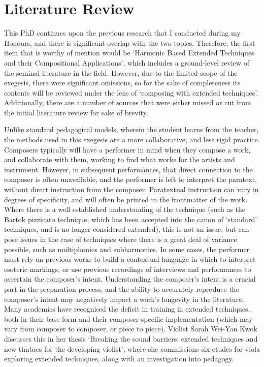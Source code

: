 \section{Literature Review}
This PhD continues upon the previous research that I conducted during my Honours, and there is significant overlap with the two topics.
Therefore, the first item that is worthy of mention would be `Harmonic Based Extended Techniques and their Compositional Applications', which includes a ground-level review of the seminal literature in the field.\autocite{grayHarmonicBasedExtended2019}
However, due to the limited scope of the exegesis, there were significant omissions, so for the sake of completeness its contents will be reviewed under the lens of `composing with extended techniques'.
Additionally, there are a number of sources that were either missed or cut from the initial literature review for sake of brevity.

Unlike standard pedagogical models, wherein the student learns from the teacher, the methods used in this exegesis are a more collaborative, and less rigid practice.
Composers typically will have a performer in mind when they compose a work, and collaborate with them, working to find what works for the artists and instrument.
However, in subsequent performances, that direct connection to the composer is often unavailable, and the performer is left to interpret the paratext, without direct instruction from the composer.
Paratextual instruction can vary in degrees of specificity, and will often be printed in the frontmatter of the work.
Where there is a well established understanding of the technique (such as the Bartok pizzicato technique, which has been accepted into the canon of `standard' techniques, and is no longer considered extended), this is not an issue, but can pose issues in the case of techniques where there is a great deal of variance possible, such as multiphonics and subharmonics.
In some cases, the performer must rely on previous works to build a contextual language in which to interpret esoteric markings, or use previous recordings of interviews and performances to ascertain the composer's intent.
Understanding the composer's intent is a crucial part in the preparation process, and the ability to accurately reproduce the composer's intent may negatively impact a work's longevity in the literature.
Many academics have recognised the deficit in training in extended techniques, both in their base form and their composer-specific implementation (which may vary from composer to composer, or piece to piece). 
Violist Sarah Wei-Yan Kwok discusses this in her thesis `Breaking the sound barriers: extended techniques and new timbres for the developing violist', where she commissions six etudes for viola exploring extended techniques, along with an investigation into pedagogy.\autocite{kwokBreakingSoundBarriers2018}

